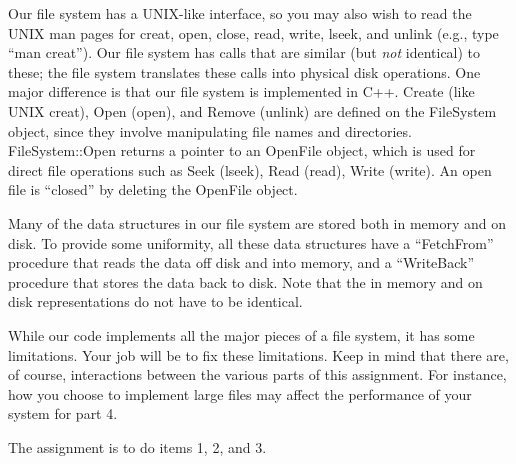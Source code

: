 Our file system has a UNIX-like interface, so you may also wish to read 
the UNIX man pages for creat, open, close, read, write, lseek, and unlink
(e.g., type ``man creat'').  
Our file system has calls that are similar (but {\em not} identical) to these;
the file system translates these calls 
into physical disk operations.  One major difference is that our 
file system is implemented in C++.  Create (like UNIX creat), 
Open (open), and Remove (unlink) are defined on the FileSystem object, 
since they involve manipulating file names and directories.  
FileSystem::Open returns a pointer to an OpenFile object, 
which is used for direct file operations such as Seek (lseek), Read (read),
Write (write).  An open file is ``closed'' by deleting the OpenFile object.

Many of the data structures in our file system are
stored both in memory and on disk.  To provide some uniformity,
all these data structures
have a ``FetchFrom'' procedure that reads the data off disk and into memory,
and a ``WriteBack'' procedure that stores the data back to disk.
Note that the in memory and on disk representations do not have
to be identical.

While our code implements all the major pieces of a file system, it
has some limitations.  Your job will be to fix these limitations.
Keep in mind that there are, of course, interactions between the
various parts of this assignment.  For instance, how you choose
to implement large files may affect the performance of
your system for part 4.

The assignment is to do items 1, 2, and 3. 

